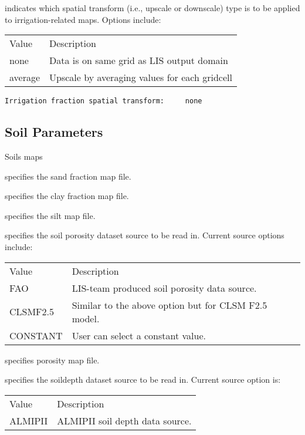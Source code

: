  
  indicates which spatial transform
 (i.e., upscale or downscale) type is to be applied to
 irrigation-related maps.  Options include:

 \begin{tabular}{ll}
 Value   & Description                                   \\
 none    & Data is on same grid as LIS output domain     \\
 average & Upscale by averaging values for each gridcell \\
 \end{tabular}
 

 \begin{Verbatim}[frame=single]
Irrigation fraction spatial transform:     none
 \end{Verbatim}


 
 \subsection{Soil Parameters} \label{ssec:soilspecparams}
 

 
 Soils maps

  specifies the sand fraction map file.

  specifies the clay fraction map file.

  specifies the silt map file.


  specifies the soil porosity
 dataset source to be read in. Current source options include:

 \begin{tabular}{ll}
 Value      & Description    \\
 FAO          &  LIS-team produced soil porosity data source. \\
 CLSMF2.5     &  Similar to the above option but for CLSM F2.5 model. \\
 CONSTANT     &  User can select a constant value. \\
 \end{tabular}

  specifies porosity map file.

  specifies the soildepth dataset source
 to be read in.  Current source option is:

 \begin{tabular}{ll}
 Value      & Description    \\
   ALMIPII  &  ALMIPII soil depth data source. \\
 \end{tabular}


